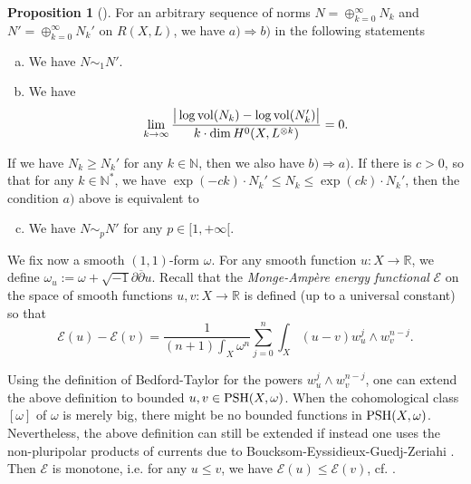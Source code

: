 \documentclass[12pt]{article}
\numberwithin{equation}{section}
\theoremstyle{theorem}
\theoremstyle{definition}
\newtheorem{prop}[thm]{Proposition}
\theoremstyle{remark}
\newcommand{\imun} {\sqrt{-1}}
\newcommand{\real}{\mathbb{R}}
\newcommand{\nat}{\mathbb{N}}
\newcommand{\dbar}{ \overline{\partial} }
\begin{document}
	\begin{prop}[{\cite[Proposition 5.4]{FinEigToepl}}]\label{prop_d_p_and_vol}
		For an arbitrary sequence of norms $N = \oplus_{k = 0}^{\infty} N_k$ and $N' = \oplus_{k = 0}^{\infty} N_k'$ on $R(X, L)$, we have $a) \Rightarrow b)$ in the following statements
		\begin{enumerate}[a)]
			\item We have $N \sim_1 N'$.
			\item We have \begin{equation}
				\lim_{k \to \infty}
		\frac{\big|
		\log {\rm{vol}} (N_k) - \log {\rm{vol}} (N_k')
		\big|}{k \cdot \dim H^0(X, L^{\otimes k})}
		=
		0.
			\end{equation}
		\end{enumerate}
		If we have $N_k \geq N_k'$ for any $k \in \nat$, then we also have $b) \Rightarrow a)$.
		If there is $c > 0$, so that for any $k \in \nat^*$, we have $\exp(-c k) \cdot N_k' \leq N_k \leq \exp(c k) \cdot N_k'$, then the condition $a)$ above is equivalent to
		\begin{enumerate}[a)]
			\setcounter{enumi}{2}
			\item We have $N \sim_p N'$ for any $p \in [1, +\infty[$.
		\end{enumerate}
	\end{prop}
	\par 
	We fix now a smooth $(1, 1)$-form $\omega$.
	For any smooth function $u : X \to \real$, we define $\omega_u := \omega + \imun \partial \dbar u$.
	Recall that the \textit{Monge-Ampère energy functional} $\mathscr{E}$ on the space of smooth functions $u, v : X \to \real$ is defined (up to a universal constant) so that
	\begin{equation}\label{eq_energy}
		\mathscr{E}(u) - \mathscr{E}(v)
		=
		\frac{1}{(n + 1) \int_X \omega^n}
		\sum_{j = 0}^{n} \int_X (u - v) w_u^j \wedge w_v^{n - j}.
	\end{equation}
	\par 
	Using the definition of Bedford-Taylor for the powers $ w_u^j \wedge w_v^{n - j}$, one can extend the above definition to bounded $u, v \in {\rm{PSH}}(X, \omega)$.
	When the cohomological class $[\omega]$ of $\omega$ is merely big, there might be no bounded functions in ${\rm{PSH}}(X, \omega)$.
	Nevertheless, the above definition can still be extended if instead one uses the non-pluripolar products of currents due to Boucksom-Eyssidieux-Guedj-Zeriahi \cite{BEGZ}.
	Then $\mathscr{E}$ is monotone, i.e. for any $u \leq v$, we have $\mathscr{E}(u) \leq \mathscr{E}(v)$, cf. \cite[Proposition 10.14]{GuedjZeriahBook}.
\end{document}
